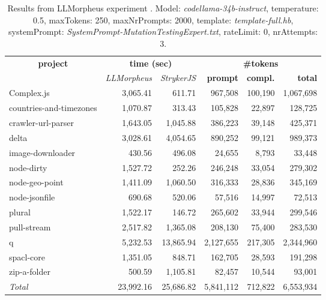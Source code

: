 
\begin{table*}[hbt!]
\centering
{\scriptsize
\begin{tabular}{l||r|r|r|r|r}
\multicolumn{1}{c|}{\bf project} & \multicolumn{2}{|c|}{\bf time (sec)} & \multicolumn{3}{|c|}{\bf \#tokens} \\
               & {\it LLMorpheus} & {\it StrykerJS} & {\bf prompt} & {\bf compl.} & {\bf total} \\
\hline
  Complex.js & 3,065.41 & 611.71 & 967,508 & 100,190 & 1,067,698 \\ 
countries-and-timezones & 1,070.87 & 313.43 & 105,828 & 22,897 & 128,725 \\ 
crawler-url-parser & 1,643.05 & 1,045.88 & 386,223 & 39,148 & 425,371 \\ 
delta & 3,028.61 & 4,054.65 & 890,252 & 99,121 & 989,373 \\ 
image-downloader & 430.56 & 496.08 & 24,655 & 8,793 & 33,448 \\ 
node-dirty & 1,527.72 & 252.26 & 246,248 & 33,054 & 279,302 \\ 
node-geo-point & 1,411.09 & 1,060.50 & 316,333 & 28,836 & 345,169 \\ 
node-jsonfile & 690.68 & 520.06 & 57,516 & 14,997 & 72,513 \\ 
plural & 1,522.17 & 146.72 & 265,602 & 33,944 & 299,546 \\ 
pull-stream & 2,517.82 & 1,365.08 & 208,130 & 75,400 & 283,530 \\ 
q & 5,232.53 & 13,865.94 & 2,127,655 & 217,305 & 2,344,960 \\ 
spacl-core & 1,351.05 & 848.71 & 162,705 & 28,593 & 191,298 \\ 
zip-a-folder & 500.59 & 1,105.81 & 82,457 & 10,544 & 93,001 \\ 
\hline
  \textit{Total} & 23,992.16 & 25,686.82 & 5,841,112 & 712,822 & 6,553,934 \\
  \end{tabular}
  }
  \\[2mm]
  \caption{Results from LLMorpheus experiment .
    Model: \textit{codellama-34b-instruct}, 
    temperature: 0.5, 
    maxTokens: 250, 
    maxNrPrompts: 2000, 
    template: \textit{template-full.hb}, 
    systemPrompt: \textit{SystemPrompt-MutationTestingExpert.txt}, 
    rateLimit: 0, 
    nrAttempts: 3.  
  }
  \label{table:Cost:run319:codellama-34b-instruct:template-full.hb:0.5}
\end{table*}